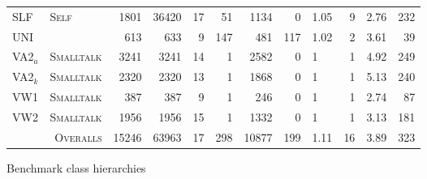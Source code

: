 \begin{figure}[htbp]
\begin{tabular}{@{ }l@{ }||@{ }l@{ }|@{ }r@{ }|@{ }r@{ }|@{ }r@{ }|@{ }r@{ }|@{ }r@{ }|@{ }r@{ }|@{ }l@{ }|@{ }r@{ }|@{ }r@{ }|@{ }r@{ }}
 SLF & \tiny{\textsc{Self}}        & 1801 & 36420 & 17 &  51 & 1134 &   0 & 1.05 &  9 & 2.76 & 232 \\ %
 UNI & \tiny{\textsc{\Cpp{}}}      &  613 &   633 &  9 & 147 &  481 & 117 & 1.02 &  2 & 3.61 &  39 \\ %
 VA2$_a$& \tiny{\textsc{Smalltalk}}& 3241 &  3241 & 14 &   1 & 2582 &   0 & 1    &  1 & 4.92 & 249 \\ %
 VA2$_k$& \tiny{\textsc{Smalltalk}}& 2320 &  2320 & 13 &   1 & 1868 &   0 & 1    &  1 & 5.13 & 240 \\ %
 VW1 & \tiny{\textsc{Smalltalk}}   &  387 &   387 &  9 &   1 &  246 &   0 & 1    &  1 & 2.74 &  87 \\ %
 VW2 & \tiny{\textsc{Smalltalk}}   & 1956 &  1956 & 15 &   1 & 1332 &   0 & 1    &  1 & 3.13 & 181 \\ %
\hline %
\multicolumn{2}{r|}{\tiny{\textsc{Overalls}}} &15246 & 63963 & 17 & 298 &10877 & 199 & 1.11 & 16 & 3.89 & 323 \\ %
\hline %
\end{tabular}
\caption{Benchmark class hierarchies}
\label{fig:benchmarks}
\end{figure}

